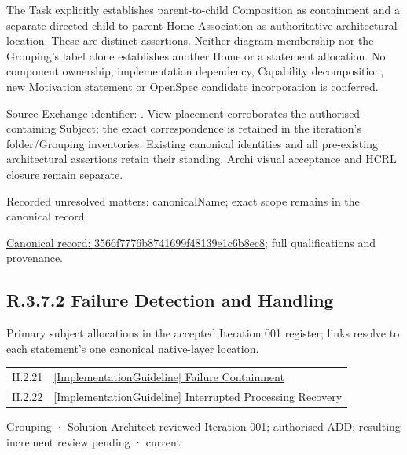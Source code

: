 The Task explicitly establishes parent-to-child Composition as containment and
a separate directed child-to-parent Home Association as authoritative architectural
location. These are distinct assertions. Neither diagram membership nor the
Grouping's label alone establishes another Home or a statement allocation.
No component ownership, implementation dependency, Capability decomposition,
new Motivation statement or OpenSpec candidate incorporation is conferred.



Source Exchange identifier: \texttt{}. View placement corroborates
the authorised containing Subject; the exact correspondence is retained in the
iteration's folder/Grouping inventories. Existing canonical identities and all
pre-existing architectural assertions retain their standing. Archi visual
acceptance and HCRL closure remain separate.


{\small Recorded unresolved matters: canonicalName; exact scope remains in the canonical record.}\par
{\footnotesize \href{../../../../continuum/grouping/3566f7776b8741699f48139e1c6b8ec8.md}{Canonical record: 3566f7776b8741699f48139e1c6b8ec8}; full qualifications and provenance.}\par
\subsection*{R.3.7.2 Failure Detection and Handling}
\label{navigation:R.3.7.2}

Primary subject allocations in the accepted Iteration 001 register; links resolve to each statement’s one canonical native-layer location.\par
\begin{longtable}{p{.22\linewidth}p{.73\linewidth}}
II.2.21 & \hyperref[element:93e40f54c22846538d91dc901ee34633]{[ImplementationGuideline] Failure Containment} \\
II.2.22 & \hyperref[element:6ca05ae8b3b34c1493ecdb48cfda1979]{[ImplementationGuideline] Interrupted Processing Recovery} \\
\end{longtable}
\label{element:e9804b6dea5c4e1db80be1925463786f}
{\small Grouping · Solution Architect-reviewed Iteration 001; authorised ADD; resulting increment review pending · current}\par

